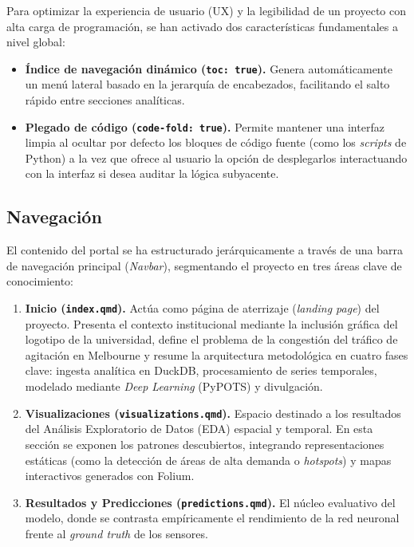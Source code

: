 Para optimizar la experiencia de usuario (UX) y la legibilidad de un proyecto con alta carga de programación, se han activado dos características fundamentales a nivel global:
\begin{itemize}
	\item \textbf{Índice de navegación dinámico (\texttt{toc: true}).} Genera automáticamente un menú lateral basado en la jerarquía de encabezados, facilitando el salto rápido entre secciones analíticas.
	\item \textbf{Plegado de código (\texttt{code-fold: true}).} Permite mantener una interfaz limpia al ocultar por defecto los bloques de código fuente (como los \textit{scripts} de Python) a la vez que ofrece al usuario la opción de desplegarlos interactuando con la interfaz si desea auditar la lógica subyacente.
\end{itemize}

\subsection{Navegación}
\label{subsec:quarto_estructura}

El contenido del portal se ha estructurado jerárquicamente a través de una barra de navegación principal (\textit{Navbar}), segmentando el proyecto en tres áreas clave de conocimiento:

\begin{enumerate}
	\item \textbf{Inicio (\texttt{index.qmd}).} Actúa como página de aterrizaje (\textit{landing page}) del proyecto. Presenta el contexto institucional mediante la inclusión gráfica del logotipo de la universidad, define el problema de la congestión del tráfico de agitación en Melbourne y resume la arquitectura metodológica en cuatro fases clave: ingesta analítica en DuckDB, procesamiento de series temporales, modelado mediante \textit{Deep Learning} (PyPOTS) y divulgación.
	\item \textbf{Visualizaciones (\texttt{visualizations.qmd}).} Espacio destinado a los resultados del Análisis Exploratorio de Datos (EDA) espacial y temporal. En esta sección se exponen los patrones descubiertos, integrando representaciones estáticas (como la detección de áreas de alta demanda o \textit{hotspots}) y mapas interactivos generados con Folium.
	\item \textbf{Resultados y Predicciones (\texttt{predictions.qmd}).} El núcleo evaluativo del modelo, donde se contrasta empíricamente el rendimiento de la red neuronal frente al \textit{ground truth} de los sensores.
\end{enumerate}

